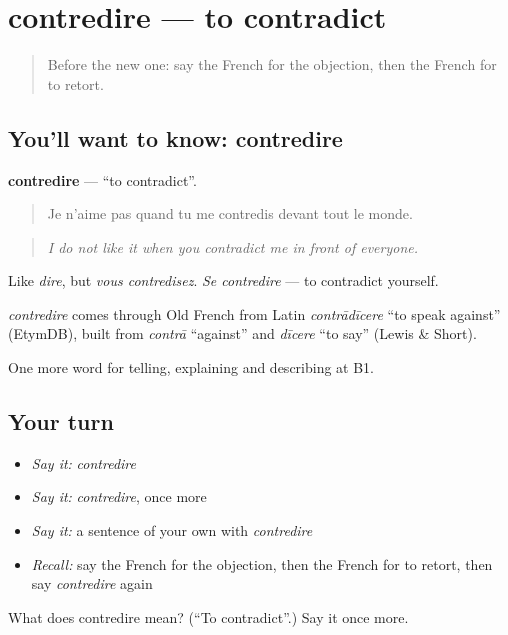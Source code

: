 \section[contredire]{contredire — to contradict}

\label{lesson:FR-C336-contredire}



\begin{quote}
Before the new one: say the French for the objection, then the French for to retort.
\end{quote}

\subsection*{You'll want to know: contredire}
\textbf{contredire} — \textquotedblleft{}to contradict\textquotedblright{}.

\begin{quote}
Je n'aime pas quand tu me contredis devant tout le monde.
\end{quote}

\begin{quote}
\emph{I do not like it when you contradict me in front of everyone.}
\end{quote}

Like \emph{dire}, but \emph{vous contredisez}. \emph{Se contredire} — to contradict yourself.

\begin{cousinweb}
\emph{contredire} comes through Old French from Latin \emph{contrādīcere} \textquotedblleft{}to speak against\textquotedblright{} (EtymDB), built from \emph{contrā} \textquotedblleft{}against\textquotedblright{} and \emph{dīcere} \textquotedblleft{}to say\textquotedblright{} (Lewis \& Short).
\end{cousinweb}

\begin{grammarlens}[title={What you've built}]
One more word for telling, explaining and describing at B1.
\end{grammarlens}

\subsection*{Your turn}
\begin{itemize}
\raggedright
  \item \emph{Say it:} \emph{contredire}
  \item \emph{Say it:} \emph{contredire}, once more
  \item \emph{Say it:} a sentence of your own with \emph{contredire}
  \item \emph{Recall:} say the French for the objection, then the French for to retort, then say \emph{contredire} again
\end{itemize}

\begin{tcolorbox}[breakable,colback=teal!4,colframe=teal!35!black,title={Before you move on}]
What does contredire mean? (\textquotedblleft{}To contradict\textquotedblright{}.) Say it once more.
\end{tcolorbox}
